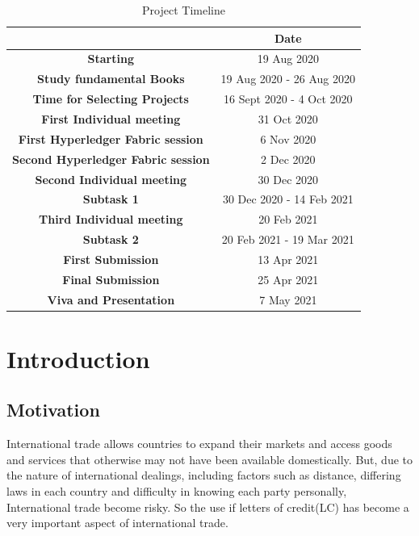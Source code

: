 \documentclass[a4paper,12pt]{report}
\begin{document}
\begin{table}[h]
    \centering
    \begin{tabular}{|c|c|}
    \hline
         &\textbf{Date}  \\
         \hline
    \textbf{Starting}     & 19 Aug 2020\\
    \hline
    \textbf{Study fundamental Books} & 19 Aug 2020 - 26 Aug 2020\\
    \hline
    \textbf{Time for Selecting Projects} & 16 Sept 2020 - 4 Oct 2020\\
    \hline
    \textbf{First Individual meeting} & 31 Oct 2020\\
    \hline
    \textbf{ First Hyperledger Fabric session} & 6 Nov 2020\\
    \hline
    \textbf{Second Hyperledger Fabric session} & 2 Dec 2020\\
    \hline
    \textbf{Second Individual meeting} & 30 Dec 2020\\
    \hline
    \textbf{Subtask 1} & 30 Dec 2020 - 14 Feb 2021\\
    \hline
    \textbf{Third Individual meeting} & 20 Feb 2021\\
    \hline
    \textbf{Subtask 2} & 20 Feb 2021 - 19 Mar 2021 \\
    \hline
    \textbf{First Submission} & 13 Apr 2021 \\
    \hline
    \textbf{Final Submission} & 25 Apr 2021 \\
    \hline
    \textbf{Viva and Presentation} & 7 May 2021 \\
    \hline
    
    \end{tabular}
    \caption{Project Timeline}
    \label{tab:timeline}
\end{table}


\newpage


\chapter{Introduction}

\section{Motivation}
International trade allows countries to expand their markets and access goods and services that otherwise may not have been available domestically. But, due to the nature of international dealings, including factors such as distance, differing laws in each country and difficulty in knowing each party personally, International trade become risky. So the use if letters of credit(LC) has become a very important aspect of international trade.
\end{document}
